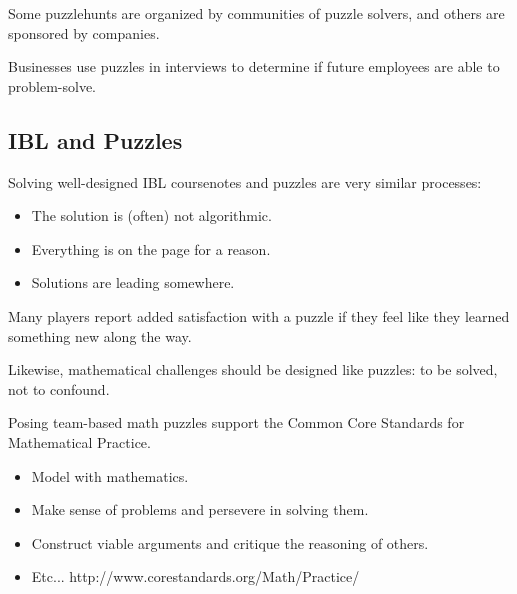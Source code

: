 \documentclass{beamer}
\newcommand{\vpause}{\pause\vspace{1em}}
\begin{document}
\begin{frame}
  Some puzzlehunts are organized by communities of puzzle solvers,
  and others are sponsored by companies.

  \vpause

  Businesses use puzzles in interviews to determine if
  future employees are able to problem-solve.
\end{frame}

\subsection{IBL and Puzzles}

\begin{frame}
  Solving well-designed IBL coursenotes and puzzles
  are very similar processes:

  \pause

  \begin{itemize}
    \item The solution is (often) not algorithmic.
    \pause
    \item Everything is on the page for a reason.
    \pause
    \item Solutions are leading somewhere.
  \end{itemize}
\end{frame}

\begin{frame}
  Many players report added satisfaction with a puzzle if they feel like they
  learned something new along the way.

  \vpause

  Likewise, mathematical challenges should be designed like
  puzzles: to be solved, not to confound.
\end{frame}

\begin{frame}
  Posing team-based math puzzles support the
  Common Core Standards for Mathematical Practice.

  \pause

  \begin{itemize}
    \item Model with mathematics.
    \pause
    \item Make sense of problems and persevere in solving them.
    \pause
    \item Construct viable arguments and critique the reasoning of others.
    \pause
    \item Etc...
          http://www.corestandards.org/Math/Practice/
  \end{itemize}
\end{frame}
\end{document}
